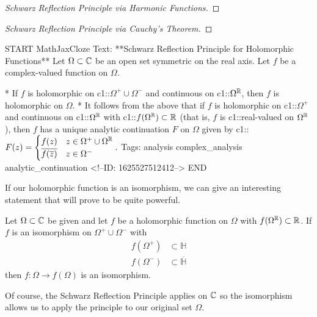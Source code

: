 \documentclass{memoir}
\begin{document}
\begin{proof}[Schwarz Reflection Principle via Harmonic Functions]
	
\end{proof}

\begin{proof}[Schwarz Reflection Principle via Cauchy's Theorem]
	
\end{proof}

\begin{anki}
START
MathJaxCloze
Text: **Schwarz Reflection Principle for Holomorphic Functions**
Let \(\Omega \subset \mathbb{C}\) be an open set symmetric on the real axis. Let \(f\) be a complex-valued function on \(\Omega \).

* If \(f\) is holomorphic on {{c1::\(\Omega^{+}\cup \Omega^{-}\)}} and continuous on {{c1::\(\Omega^{\mathbb{R}}\)}}, then \(f\) is holomorphic on \(\Omega \).
* It follows from the above that if \(f\) is holomorphic on {{c1::\(\Omega^{+}\)}} and continuous on {{c1::\(\Omega^{\mathbb{R}}\)}} with {{c1::\(f(\Omega^{\mathbb{R}}) \subset \mathbb{R}\)}} (that is, \(f\) is {{c1::real-valued on \(\Omega^{\mathbb{R}}\)}}), then \(f\) has a unique analytic continuation \(F\) on \(\Omega \) given by
{{c1::\(\begin{align*}
        	F(z) = \begin{cases}
        		f(z) & z \in \Omega^{+}\cup \Omega^{\mathbb{R}}\\
        		\overline{f(\overline{z})} & z \in \Omega^{-}
        	\end{cases}.
        \end{align*}\)}}
Tags: analysis complex_analysis analytic_continuation
<!--ID: 1625527512412-->
END
\end{anki}

If our holomorphic function is an isomorphism, we can give an interesting statement that will prove to be quite powerful.

\begin{prop}
	Let \(\Omega \subset \mathbb{C}\) be given and let \(f\) be a holomorphic function on \(\Omega \) with \(f(\Omega^{\mathbb{R}}) \subset \mathbb{R}\).
	If \(f\) is an isomorphism on \(\Omega^{+}\cup \Omega^{-}\) with
	\begin{align*}
		f(\Omega^{+}) &\subset \mathbb{H}\\
		f(\Omega^{-}) &\subset \overline{\mathbb{H}}
	\end{align*}
	then \(f:\Omega \to f(\Omega )\) is an isomorphism.
\end{prop}
Of course, the Schwarz Reflection Principle applies on \(\mathbb{C}\) so the isomorphism allows us to apply the principle to our original set \(\Omega \).
\end{document}
